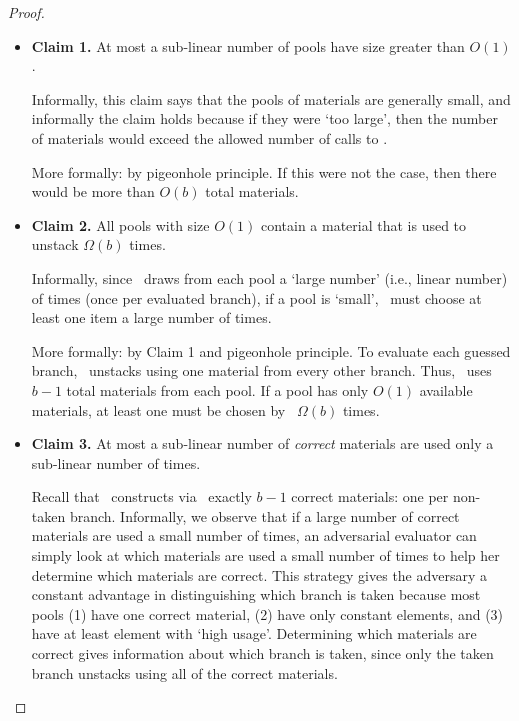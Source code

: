 \begin{proof}
\begin{itemize}
  \item \textbf{Claim 1.} At most a sub-linear number of pools have
    size greater than $O(1)$.
    \begin{subproof}
      Informally, this claim says that the pools of materials are
      generally small, and informally the claim holds because if they
      were `too large', then the number of materials would exceed the
      allowed number of calls to \Gb.

      More formally: by pigeonhole principle.
      If this were not the case, then there
      would be more than $O(b)$ total materials.
    \end{subproof}

  \item \textbf{Claim 2.}
    All pools with size $O(1)$ contain a material that is used to
    unstack $\Omega(b)$ times.
    \begin{subproof}
      Informally, since \Eval\ draws from each pool a `large number'
      (i.e., linear number) of times (once per evaluated branch),
      if a pool is `small', \Eval\ must choose at least one item  a
      large number of times.

      More formally: by Claim 1 and pigeonhole principle. To evaluate
      each guessed branch, \Eval\ unstacks using one material from every other
      branch.  Thus, \Eval\ uses $b-1$ total materials from each pool.
      If a pool has only $O(1)$ available materials, at least one
      must be chosen by \Eval\ $\Omega(b)$ times.
    \end{subproof}

  \item \textbf{Claim 3.} At most a sub-linear number of
    \emph{correct} materials are used only a sub-linear number of times.
  \begin{subproof}
    Recall that \Eval\ constructs via \Gb\ exactly $b-1$ correct
    materials: one per non-taken branch.
    Informally, we observe that if a large number
    of correct materials are used a small number of times, an
    adversarial evaluator can simply look at which materials are used
    a small number of times to help her determine which materials are
    correct.
    This strategy gives the adversary a constant advantage in
    distinguishing which branch is taken because most pools (1) have
    one correct material, (2) have only constant elements, and (3) have
    at least element with `high usage'.
    Determining which materials are correct gives information about
    which branch is taken, since only the taken branch unstacks using
    all of the correct materials.


\end{subproof}
\end{itemize}
\end{proof}
